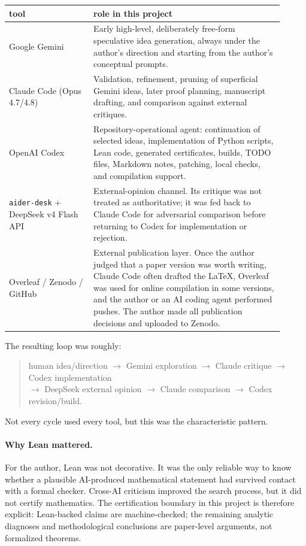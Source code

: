 \documentclass[11pt,a4paper]{article}
\theoremstyle{definition}
\begin{document}
\begin{center}
\small
\begin{tabular}{p{0.28\linewidth}p{0.63\linewidth}}
\toprule
tool & role in this project \\
\midrule
Google Gemini & Early high-level, deliberately free-form speculative
idea generation, always under the author's direction and starting from the
author's conceptual prompts. \\
Claude Code (Opus 4.7/4.8) & Validation, refinement, pruning of superficial
Gemini ideas, later proof planning, manuscript drafting, and comparison
against external critiques. \\
OpenAI Codex & Repository-operational agent: continuation of selected ideas,
implementation of Python scripts, Lean code, generated certificates, builds,
TODO files, Markdown notes, patching, local checks, and compilation support. \\
\texttt{aider-desk} + DeepSeek v4 Flash API & External-opinion channel. Its
critique was not treated as authoritative; it was fed back to Claude Code for
adversarial comparison before returning to Codex for implementation or
rejection. \\
Overleaf / Zenodo / GitHub & External publication layer. Once the author judged
that a paper version was worth writing, Claude Code often drafted the
\LaTeX{}, Overleaf was used for online compilation in some versions, and the
author or an AI coding agent performed pushes. The author made all publication
decisions and uploaded to Zenodo. \\
\bottomrule
\end{tabular}
\end{center}

The resulting loop was roughly:
\begin{quote}
\small
human idea/direction $\to$ Gemini exploration $\to$ Claude critique
$\to$ Codex implementation\\
$\to$ DeepSeek external opinion $\to$ Claude comparison
$\to$ Codex revision/build.
\end{quote}
Not every cycle used every tool, but this was the characteristic pattern.

\paragraph{Why Lean mattered.}
For the author, Lean was not decorative. It was the only reliable way to know
whether a plausible AI-produced mathematical statement had survived contact
with a formal checker. Cross-AI criticism improved the search process, but it
did not certify mathematics. The certification boundary in this project is
therefore explicit: Lean-backed claims are machine-checked; the remaining
analytic diagnoses and methodological conclusions are paper-level arguments,
not formalized theorems.
\end{document}
